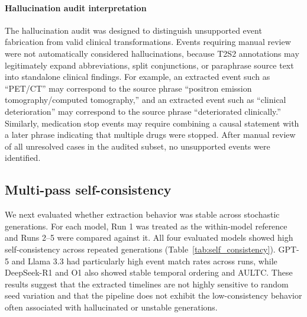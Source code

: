 \documentclass[pmlr,twocolumn,10pt]{jmlr} %
\begin{document}
\paragraph{Hallucination audit interpretation}
The hallucination audit was designed to distinguish unsupported event fabrication from valid clinical transformations.
Events requiring manual review were not automatically considered hallucinations, because T2S2 annotations may legitimately expand abbreviations, split conjunctions, or paraphrase source text into standalone clinical findings.
For example, an extracted event such as ``PET/CT'' may correspond to the source phrase ``positron emission tomography/computed tomography,'' and an extracted event such as ``clinical deterioration'' may correspond to the source phrase ``deteriorated clinically.''
Similarly, medication stop events may require combining a causal statement with a later phrase indicating that multiple drugs were stopped.
After manual review of all unresolved cases in the audited subset, no unsupported events were identified.

\clearpage
\subsection{Multi-pass self-consistency}
\label{apd:self_consistency_results}
We next evaluated whether extraction behavior was stable across stochastic generations.
For each model, Run 1 was treated as the within-model reference and Runs 2--5 were compared against it.
All four evaluated models showed high self-consistency across repeated generations (Table~\ref{tab:self_consistency}).
GPT-5 and Llama 3.3 had particularly high event match rates across runs, while DeepSeek-R1 and O1 also showed stable temporal ordering and AULTC.
These results suggest that the extracted timelines are not highly sensitive to random seed variation and that the pipeline does not exhibit the low-consistency behavior often associated with hallucinated or unstable generations.
\end{document}
